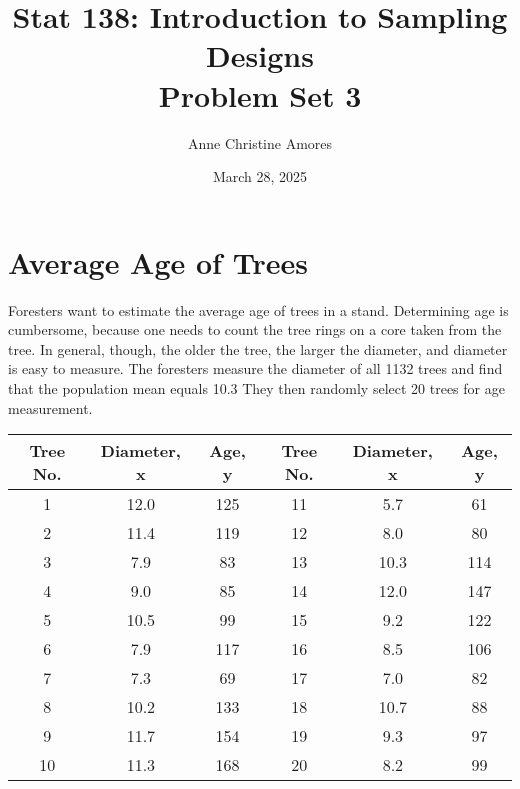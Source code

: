 \documentclass[]{article}
\author{}
\date{\vspace{-2.5em}}
\title{Stat 138: Introduction to Sampling Designs \\ Problem Set 3}
\author{Anne Christine Amores}
\date{March 28, 2025}
\begin{document}
\maketitle

\section{Average Age of Trees}

Foresters want to estimate the average age of trees in a stand. Determining age is cumbersome, because one needs to count the tree rings on a core taken from the tree. In general, though, the older the tree, the larger the diameter, and diameter is easy to measure. The foresters measure the diameter of all 1132 trees and find that the population mean equals 10.3 They then randomly select 20 trees for age measurement. 

\begin{table}[H]  %
    \centering
    \begin{tabular}{ccc | ccc}
       \hline
       Tree No. & Diameter, x & Age, y & Tree No. & Diameter, x & Age, y \\
       \hline
        1  & 12.0 & 125  & 11 & 5.7  & 61  \\
        2  & 11.4 & 119  & 12 & 8.0  & 80  \\
        3  & 7.9  & 83   & 13 & 10.3 & 114 \\
        4  & 9.0  & 85   & 14 & 12.0 & 147 \\
        5  & 10.5 & 99   & 15 & 9.2  & 122 \\
        6  & 7.9  & 117  & 16 & 8.5  & 106 \\
        7  & 7.3  & 69   & 17 & 7.0  & 82  \\
        8  & 10.2 & 133  & 18 & 10.7 & 88  \\
        9  & 11.7 & 154  & 19 & 9.3  & 97  \\
        10 & 11.3 & 168  & 20 & 8.2  & 99  \\
       \hline
    \end{tabular}
\end{table}
\end{document}
